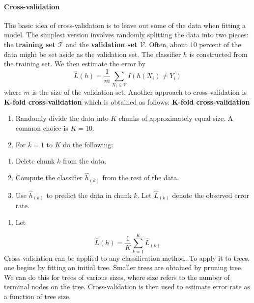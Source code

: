 \paragraph{Cross-validation}\label{cross-validation}
The basic idea of cross-validation is to leave out some of the data when
fitting a model. The simplest version involves randomly splitting the
data into two pieces: the \textbf{training set \(\mathcal{T}\)} and the
\textbf{validation set \(\mathcal{V}\)}. Often, about 10 percent of the
data might be set aside as the validation set. The classifier \(h\) is
constructed from the training set. We then estimate the error by
\[
\hat{L}(h) = \frac{1}{m} \sum_{X_{i} \in \mathcal{V}} I(h(X_{i}) \neq Y_{i})
\]
where \(m\) is the size of the validation set.
Another approach to cross-validation is \textbf{K-fold cross-validation}
which is obtained as follows:
\textbf{K-fold cross-validation}
\begin{enumerate}
\def\labelenumi{\arabic{enumi}.}
\item
  Randomly divide the data into \(K\) chunks of approximately equal
  size. A common choice is \(K = 10\).
\item
  For \(k = 1\) to \(K\) do the following:
\end{enumerate}
\begin{enumerate}
\def\labelenumi{(\alph{enumi})}
\item
  Delete chunk \(k\) from the data.
\item
  Compute the classifier \(\hat{h}_{(k)}\) from the rest of the data.
\item
  Use \(\hat{h}_{(k)}\) to predict the data in chunk \(k\). Let
  \(\hat{L}_{(k)}\) denote the observed error rate.
\end{enumerate}
\begin{enumerate}[tightlist,label={\arabic*.},resume]
\item
  Let
\end{enumerate}
\[
\hat{L}(h) = \frac{1}{K} \sum_{k=1}^K \hat{L}_{(k)}
\]
Cross-validation can be applied to any classification method. To apply
it to trees, one begins by fitting an initial tree. Smaller trees are
obtained by pruning tree. We can do this for trees of various sizes,
where size refers to the number of terminal nodes on the tree.
Cross-validation is then used to estimate error rate as a function of
tree size.
